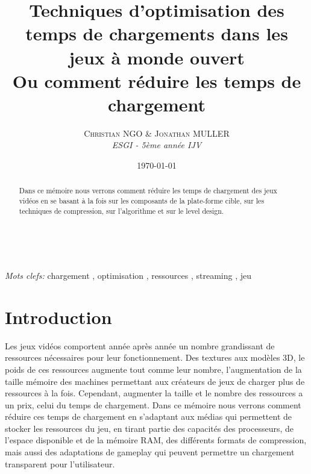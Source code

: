 \documentclass[a4paper, 11pt]{article} %
\title{\textbf{Techniques d'optimisation des temps de chargements dans les jeux à monde ouvert}\\ %
Ou comment réduire les temps de chargement} %
\author{\textsc{Christian NGO \& Jonathan MULLER} %
\\{\textit{ESGI - 5ème année IJV}}} %
\date{\today} %
\makeatletter
\renewcommand{\maketitle}{ %
\begin{flushright} %
{\LARGE\@title} %

\vspace{50pt} %

{\large\@author} %
\\\@date %

\vspace{40pt} %
\end{flushright}
}
\makeatother
\begin{document}
\maketitle %



\begin{abstract}
Dans ce mémoire nous verrons comment réduire les temps de chargement des jeux vidéos en se basant à la fois sur les composants de la plate-forme cible, sur les techniques de compression, sur l'algorithme et sur le level design.
\end{abstract}

\hspace*{3,6mm}\textit{Mots clefs:} chargement , optimisation , ressources , streaming , jeu %

\vspace{30pt} %


\section{Introduction}

Les jeux vidéos comportent année après année un nombre grandissant de ressources nécessaires pour leur fonctionnement. Des textures aux modèles 3D, le poids de ces ressources augmente tout comme leur nombre, l'augmentation de la taille mémoire des machines permettant aux créateurs de jeux de charger plus de ressources à la fois. Cependant, augmenter la taille et le nombre des ressources a un prix, celui du temps de chargement. Dans ce mémoire nous verrons comment réduire ces temps de chargement en s'adaptant aux médias qui permettent de stocker les ressources du jeu, en tirant partie des capacités des processeurs, de l'espace disponible et de la mémoire RAM, des différents formats de compression, mais aussi des adaptations de gameplay qui peuvent permettre un chargement transparent pour l'utilisateur.
\end{document}

